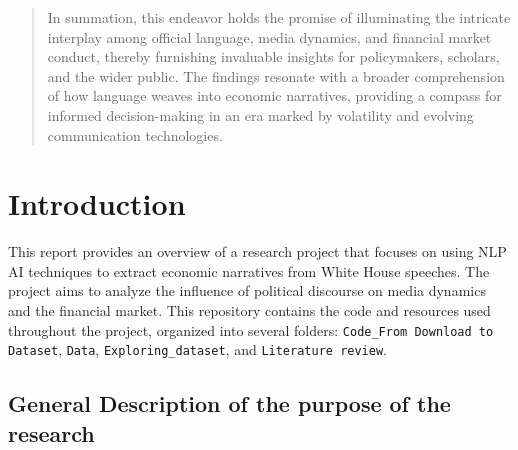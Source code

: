 \documentclass{article}
\begin{document}
\begin{abstract}
In summation, this endeavor holds the promise of illuminating the intricate interplay among official language, media dynamics, and financial market conduct, thereby furnishing invaluable insights for policymakers, scholars, and the wider public. The findings resonate with a broader comprehension of how language weaves into economic narratives, providing a compass for informed decision-making in an era marked by volatility and evolving communication technologies.

\end{abstract}
\newpage
\section{Introduction}

This report provides an overview of a research project that focuses on using NLP AI techniques to extract economic
narratives from White House speeches. The project aims to analyze the influence of political discourse on media dynamics
and the financial market. This repository contains the code and resources used throughout the project, organized into
several folders: \texttt{Code\_From Download to Dataset}, \texttt{Data}, \texttt{Exploring\_dataset}, and
\texttt{Literature review}.

\subsection{General Description of the purpose of the research}
\end{document}
